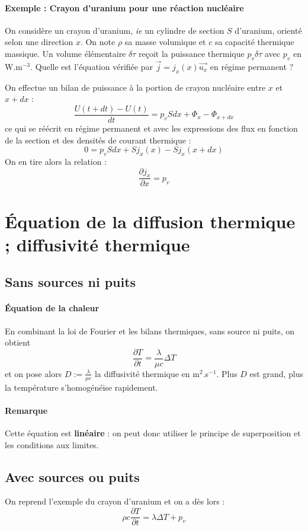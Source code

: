 \documentclass[french]{book}
\theoremstyle{plain}
\theoremstyle{definition}
\theoremstyle{remark}
\newcommand{\inv}{^{-1}}
\begin{document}
\paragraph{Exemple : Crayon d'uranium pour une réaction nucléaire} On considère un crayon d'uranium, \textit{ie} un cylindre de section $S$ d'uranium, orienté selon une direction $x$. On note $\rho$ sa masse volumique et $c$ sa capacité thermique massique. Un volume élémentaire $\delta\tau$ reçoit la puissance thermique $p_v\delta\tau$ avec $p_v$ en W.m$^{-3}$. Quelle est l'équation vérifiée par $\overrightarrow{j}=j_x(x)\overrightarrow{u_x}$ en régime permanent ? \\ \par On effectue un bilan de puissance à la portion de crayon nucléaire entre $x$ et $x+dx$ : $$\frac{U(t+dt)-U(t)}{dt}=p_vSdx+\Phi_x-\Phi_{x+dx}$$ ce qui se réécrit en régime permanent et avec les expressions des flux en fonction de la section et des densités de courant thermique : $$0=p_vSdx+Sj_x(x)-Sj_x(x+dx)$$ On en tire alors la relation : $$\frac{\partial j_x}{\partial x}=p_v$$
\section{Équation de la diffusion thermique ; diffusivité thermique}
\subsection{Sans sources ni puits}
\paragraph{Équation de la chaleur} En combinant la loi de Fourier et les bilans thermiques, sans source ni puits, on obtient $$\frac{\partial T}{\partial t}=\frac{\lambda}{\mu c}\Delta T$$ et on pose alors $\displaystyle D:=\frac{\lambda}{\mu c}$ la diffusivité thermique en m$^2$.s$\inv$. Plus $D$ est grand, plus la température s'homogénéise rapidement.
\paragraph{Remarque} Cette équation est \textbf{linéaire} : on peut donc utiliser le principe de superposition et les conditions aux limites.
\subsection{Avec sources ou puits}
On reprend l'exemple du crayon d'uranium et on a dès lors : $$\rho c\frac{\partial T}{\partial t}=\lambda\Delta T+p_v$$
\end{document}
